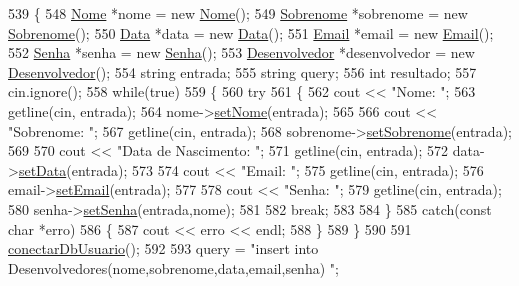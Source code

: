 \begin{DoxyCode}
539 \{
548     \mbox{\hyperlink{class_nome}{Nome}} *nome = \textcolor{keyword}{new} \mbox{\hyperlink{class_nome}{Nome}}();
549     \mbox{\hyperlink{class_sobrenome}{Sobrenome}} *sobrenome = \textcolor{keyword}{new} \mbox{\hyperlink{class_sobrenome}{Sobrenome}}();
550     \mbox{\hyperlink{class_data}{Data}} *data = \textcolor{keyword}{new} \mbox{\hyperlink{class_data}{Data}}();
551     \mbox{\hyperlink{class_email}{Email}} *email = \textcolor{keyword}{new} \mbox{\hyperlink{class_email}{Email}}();
552     \mbox{\hyperlink{class_senha}{Senha}} *senha = \textcolor{keyword}{new} \mbox{\hyperlink{class_senha}{Senha}}();
553     \mbox{\hyperlink{class_desenvolvedor}{Desenvolvedor}} *desenvolvedor = \textcolor{keyword}{new} \mbox{\hyperlink{class_desenvolvedor}{Desenvolvedor}}();
554     \textcolor{keywordtype}{string} entrada;
555     \textcolor{keywordtype}{string} query;
556     \textcolor{keywordtype}{int} resultado;
557     cin.ignore();
558     \textcolor{keywordflow}{while}(\textcolor{keyword}{true})
559     \{
560       \textcolor{keywordflow}{try}
561       \{
562         cout << \textcolor{stringliteral}{"Nome: "};
563         getline(cin, entrada);
564         nome->\mbox{\hyperlink{class_nome_a83b9f56ec9f86f4b976846f4c5c65b30}{setNome}}(entrada);
565 
566         cout << \textcolor{stringliteral}{"Sobrenome: "};
567         getline(cin, entrada);
568         sobrenome->\mbox{\hyperlink{class_sobrenome_a9dc2277e3600656838e47c86dfddd23a}{setSobrenome}}(entrada);
569 
570         cout << \textcolor{stringliteral}{"Data de Nascimento: "};
571         getline(cin, entrada);
572         data->\mbox{\hyperlink{class_data_a5245638838a033c98a8b760836dddb7d}{setData}}(entrada);
573 
574         cout << \textcolor{stringliteral}{"Email: "};
575         getline(cin, entrada);
576         email->\mbox{\hyperlink{class_email_a2614b3a19d961411d1bece9c1bdf616f}{setEmail}}(entrada);
577 
578         cout << \textcolor{stringliteral}{"Senha: "};
579         getline(cin, entrada);
580         senha->\mbox{\hyperlink{class_senha_a01bbc2a82c5f405b68f33fe0dc538ec1}{setSenha}}(entrada,nome);
581 
582         \textcolor{keywordflow}{break};
583 
584       \}
585       \textcolor{keywordflow}{catch}(\textcolor{keyword}{const} \textcolor{keywordtype}{char} *erro)
586       \{
587         cout << erro << endl;
588       \}
589     \}
590 
591     \mbox{\hyperlink{comando_sql_8cpp_a4f89ddcbc4cf8f2587d89f72f8c7900d}{conectarDbUsuario}}();
592 
593     query = \textcolor{stringliteral}{"insert into Desenvolvedores(nome,sobrenome,data,email,senha) "};

\end{DoxyCode}
